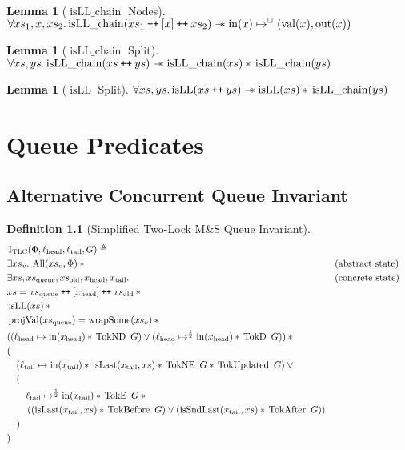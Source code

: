 \documentclass[a4paper, 10pt]{report}
\theoremstyle{definition}
\newtheorem{lemma}[theorem]{Lemma}
\newtheorem{definition}{Definition}[section]
\newcommand{\msq}{M\&S Queue}
\newcommand{\tlmsq}{Two-Lock \msq{}}
\newcommand{\TLQueueInvariantConc}{\operatorname{I_{TLC}}}
\newcommand{\xsc}{xs}
\newcommand{\xsqueue}{xs_{\mathrm{queue}}}
\newcommand{\xsold}{xs_{\mathrm{old}}}
\newcommand{\isLLchain}{\operatorname{isLL\_chain}}
\newcommand{\isLL}{\operatorname{isLL}}
\newcommand{\AllP}{\operatorname{All}}
\newcommand{\projval}{\operatorname{projVal}}
\newcommand{\wrapsome}{\operatorname{wrapSome}}
\newcommand{\isLast}{\operatorname{isLast}}
\newcommand{\isSndLast}{\operatorname{isSndLast}}
\newcommand{\locN}[1]{\loc_{\mathrm{#1}}}
\newcommand{\lochead}{\locN{head}}
\newcommand{\loctail}{\locN{tail}}
\newcommand{\nIn}[1]{\operatorname{in}(#1)}
\newcommand{\nVal}[1]{\operatorname{val}(#1)}
\newcommand{\nOut}[1]{\operatorname{out}(#1)}
\newcommand{\node}{x}
\newcommand{\nodeN}[1]{\node_{\mathrm{#1}}}
\newcommand{\nodehead}{\nodeN{head}}
\newcommand{\nodetail}{\nodeN{tail}}
\newcommand{\absvalueList}{xs_v}
\newcommand{\Qg}{G}
\newcommand{\TokE}[1]{\operatorname{TokE} ~ #1}
\newcommand{\TokEQg}{\TokE{\Qg}}
\newcommand{\TokNE}[1]{\operatorname{TokNE} ~ #1}
\newcommand{\TokNEQg}{\TokNE{\Qg}}
\newcommand{\TokD}[1]{\operatorname{TokD} ~ #1}
\newcommand{\TokDQg}{\TokD{\Qg}}
\newcommand{\TokND}[1]{\operatorname{TokND} ~ #1}
\newcommand{\TokNDQg}{\TokND{\Qg}}
\newcommand{\TokBefore}[1]{\operatorname{TokBefore} ~ #1}
\newcommand{\TokBeforeQg}{\TokBefore{\Qg}}
\newcommand{\TokAfter}[1]{\operatorname{TokAfter} ~ #1}
\newcommand{\TokAfterQg}{\TokAfter{\Qg}}
\newcommand{\TokUpdated}[1]{\operatorname{TokUpdated} ~ #1}
\newcommand{\TokUpdatedQg}{\TokUpdated{\Qg}}
\newcommand\catenate{\mathbin{\text{\ttfamily\upshape ++}}}
\newcommand{\isNode}[1]{\nIn{#1} \mapsto^{\persistently} (\nVal{#1}, \nOut{#1})}
\begin{document}
\begin{lemma}[$\isLLchain$ Nodes]\label{lemma:isLL-chain-nodes}
  $\All xs_1, x, xs_2.\\
   \isLLchain(xs_1 \catenate [x] \catenate xs_2) \wand \isNode{x}$
\end{lemma}

\begin{lemma}[$\isLLchain$ Split]\label{lemma:isLL-chain-split}
  $\All xs, ys.\\
   \isLLchain(xs \catenate ys) \wand \isLLchain(xs) \star{} \isLLchain(ys)$
\end{lemma}

\begin{lemma}[$\isLL$ Split]\label{lemma:isLL-split}
  $\All xs, ys.\\
   \isLL(xs \catenate ys) \wand \isLL(xs) \star{} \isLLchain(ys)$
\end{lemma}


\chapter{Queue Predicates}\label{ch:appendix:predicates}

\section{Alternative Concurrent Queue Invariant}\label{appendix:predicates:section:simplInv}
\begin{definition}[Simplified \tlmsq{} Invariant]\label{TLMSQ:spec:conc:invariant:simple}
  \begin{align*}
    &\TLQueueInvariantConc(\Phi, \lochead, \loctail, \Qg) \eqdef\\
    &\Exists \absvalueList. \AllP(\absvalueList, \Phi) \star{} &&\text{(abstract state)}\\
    &\Exists \xsc, \xsqueue, \xsold, \nodehead, \nodetail . &&\text{(concrete state)}\\
    &\xsc = \xsqueue \catenate [\nodehead] \catenate \xsold \star{}\\
    &\isLL(\xsc) \star{}\\
    &\projval(\xsqueue) = \wrapsome(\absvalueList) \star{}\\
    &((\lochead \mapsto \nIn{\nodehead} \star{} \TokNDQg) \lor{} (\lochead \mapsto^{\frac{1}{2}} \nIn{\nodehead} \star{} \TokDQg)) \star{}\\
    &(\\
    &\quad(\loctail \mapsto \nIn{\nodetail} \star{} \isLast(\nodetail, \xsc) \star{} \TokNEQg \star{} \TokUpdatedQg) \lor{} \\
    &\quad(\\
    &\quad\quad \loctail \mapsto^{\frac{1}{2}} \nIn{\nodetail} \star{} \TokEQg \star{}\\
    &\quad\quad\left((\isLast(\nodetail, \xsc) \star{} \TokBeforeQg) \lor{} (\isSndLast(\nodetail, \xsc) \star{} \TokAfterQg)\right)\\
    &\quad)\\
    &)
  \end{align*}
\end{definition}
\end{document}
